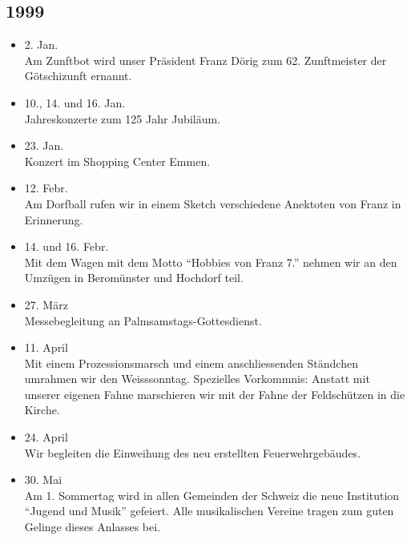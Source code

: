 \subsection*{1999}

\begin{history}


    \begin{itemize}

        \item 2. Jan.\\
              Am Zunftbot wird unser Präsident Franz Dörig zum 62. Zunftmeister der
              Götschizunft ernannt.

        \item 10., 14. und 16. Jan.\\
              Jahreskonzerte zum 125 Jahr Jubiläum.

        \item 23. Jan.\\
              Konzert im Shopping Center Emmen.

        \item 12. Febr.\\
              Am Dorfball rufen wir in einem Sketch verschiedene Anektoten von Franz
              in Erinnerung.

        \item 14. und 16. Febr.\\
              Mit dem Wagen mit dem Motto \enquote{Hobbies von Franz 7.} nehmen wir an
              den Umzügen in Beromünster und Hochdorf teil.

        \item 27. März\\
              Messebegleitung an Palmsamstags-Gottesdienst.

        \item 11. April\\
              Mit einem Prozessionsmarsch und einem anschliessenden Ständchen umrahmen
              wir den Weisssonntag. Spezielles Vorkommnis: Anstatt mit unserer eigenen
              Fahne marschieren wir mit der Fahne der Feldschützen in die Kirche.

        \item 24. April\\
              Wir begleiten die Einweihung des neu erstellten Feuerwehrgebäudes.

        \item 30. Mai\\
              Am 1. Sommertag wird in allen Gemeinden der Schweiz die neue Institution
              \enquote{Jugend und Musik} gefeiert. Alle musikalischen Vereine tragen
              zum guten Gelinge dieses Anlasses bei.


\end{itemize}
\end{history}
